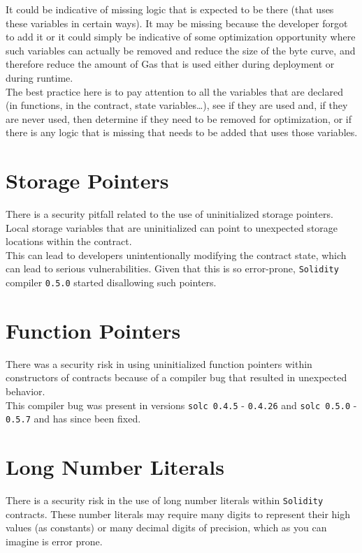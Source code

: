 It could be indicative of missing logic that is expected to be there (that uses these variables in certain ways). It may be missing because the developer forgot to add it or it could simply be indicative of some optimization opportunity where such variables can actually be removed and reduce the size of the byte curve, and therefore reduce the amount of Gas that is used either during deployment or during runtime.\\

The best practice here is to pay attention to all the variables that are declared (in functions, in the contract, state variables\dots), see if they are used and, if they are never used, then determine if they need to be removed for optimization, or if there is any logic that is missing that needs to be added that uses those variables.

\section{Storage Pointers}
There is a security pitfall related to the use of uninitialized storage pointers. Local storage variables that are uninitialized can point to unexpected storage locations within the contract. \\

This can lead to developers unintentionally modifying the contract state, which can lead to serious vulnerabilities. Given that this is so error-prone, \texttt{Solidity} compiler \texttt{0.5.0} started disallowing such pointers.

\section{Function Pointers}
There was a security risk in using uninitialized function pointers within constructors of contracts because of a compiler bug that resulted in unexpected behavior. \\

This compiler bug was present in versions \texttt{solc 0.4.5} - \texttt{0.4.26} and \texttt{solc 0.5.0} - \texttt{0.5.7} and has since been fixed.

\section{Long Number Literals}
There is a security risk in the use of long number literals within \texttt{Solidity} contracts. These number literals may require many digits to represent their high values (as constants) or many decimal digits of precision, which as you can imagine is error prone. \\

